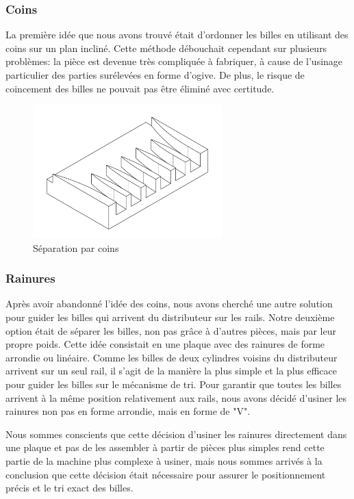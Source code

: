 \subsubsection{Coins}
La première idée que nous avons trouvé était d'ordonner les billes en utilisant des coins sur un plan incliné. Cette méthode débouchait cependant sur plusieurs problèmes: la pièce est devenue très compliquée à fabriquer, à cause de l'usinage particulier des parties surélevées en forme d'ogive. De plus, le risque de coincement des billes ne pouvait pas être éliminé avec certitude.

\begin{figure}[h]
    \centering
    \includegraphics[width=0.65\textwidth]{Graphics/Rails/COINS.pdf}
    \caption{Séparation par coins}
\end{figure}

\subsubsection{Rainures}
Après avoir abandonné l'idée des coins, nous avons cherché une autre solution pour guider les billes qui arrivent du distributeur sur les rails. Notre deuxième option était de séparer les billes, non pas grâce à d'autres pièces, mais par leur propre poids. Cette idée consistait en une plaque avec des rainures de forme arrondie ou linéaire. Comme les billes de deux cylindres voisins du distributeur arrivent sur un seul rail, il s'agit de la manière la plus simple et la plus efficace pour guider les billes sur le mécanisme de tri. Pour garantir que toutes les billes arrivent à la même position relativement aux rails, nous avons décidé d'usiner les rainures non pas en forme arrondie, mais en forme de "V".

Nous sommes conscients que cette décision d'usiner les rainures directement dans une plaque et pas de les assembler à partir de pièces plus simples rend cette partie de la machine plus complexe à usiner, mais nous sommes arrivés à la conclusion que cette décision était nécessaire pour assurer le positionnement précis et le tri exact des billes.

